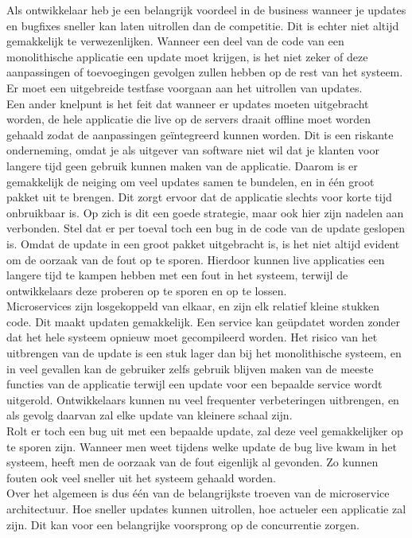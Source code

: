Als ontwikkelaar heb je een belangrijk voordeel in de business wanneer je updates en bugfixes sneller kan laten uitrollen dan de competitie. Dit is echter niet altijd gemakkelijk te verwezenlijken. Wanneer een deel van de code van een monolithische applicatie een update moet krijgen, is het niet zeker of deze aanpassingen of toevoegingen gevolgen zullen hebben op de rest van het systeem. Er moet een uitgebreide testfase voorgaan aan het uitrollen van updates.
\\
Een ander knelpunt is het feit dat wanneer er updates moeten uitgebracht worden, de hele applicatie die live op de servers draait offline moet worden gehaald zodat de aanpassingen geïntegreerd kunnen worden. Dit is een riskante onderneming, omdat je als uitgever van software niet wil dat je klanten voor langere tijd geen gebruik kunnen maken van de applicatie. Daarom is er gemakkelijk de neiging om veel updates samen te bundelen, en in één groot pakket uit te brengen. Dit zorgt ervoor dat de applicatie slechts voor korte tijd onbruikbaar is. Op zich is dit een goede strategie, maar ook hier zijn nadelen aan verbonden. Stel dat er per toeval toch een bug in de code van de update geslopen is. Omdat de update in een groot pakket uitgebracht is, is het niet altijd evident om de oorzaak van de fout op te sporen. Hierdoor kunnen live applicaties een langere tijd te kampen hebben met een fout in het systeem, terwijl de ontwikkelaars deze proberen op te sporen en op te lossen.
\\
Microservices zijn losgekoppeld van elkaar, en zijn elk relatief kleine stukken code. Dit maakt updaten gemakkelijk. Een service kan geüpdatet worden zonder dat het hele systeem opnieuw moet gecompileerd worden. Het risico van het uitbrengen van de update is een stuk lager dan bij het monolithische systeem, en in veel gevallen kan de gebruiker zelfs gebruik blijven maken van de meeste functies van de applicatie terwijl een update voor een bepaalde service wordt uitgerold. Ontwikkelaars kunnen nu veel frequenter verbeteringen uitbrengen, en als gevolg daarvan zal elke update van kleinere schaal zijn.
\\
Rolt er toch een bug uit met een bepaalde update, zal deze veel gemakkelijker op te sporen zijn. Wanneer men weet tijdens welke update de bug live kwam in het systeem, heeft men de oorzaak van de fout eigenlijk al gevonden. Zo kunnen fouten ook veel sneller uit het systeem gehaald worden.
\\
Over het algemeen is dus één van de belangrijkste troeven van de microservice architectuur. Hoe sneller updates kunnen uitrollen, hoe actueler een applicatie zal zijn. Dit kan voor een belangrijke voorsprong op de concurrentie zorgen.

